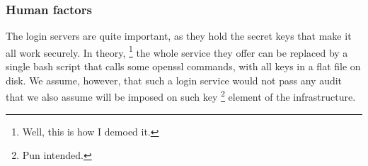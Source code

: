 \subsubsection{Human factors}
The login servers are quite important,
as they hold the secret keys that make it all work securely.
In theory,%
\footnote{Well,
this is how I demoed it.}
the whole service they offer can be replaced by a single bash script that calls some openssl commands,
with all keys in a flat file on disk.
We assume,
however,
that such a login service would not pass any audit that we also assume will be imposed on such key%
\footnote{Pun intended.}
element of the infrastructure.

